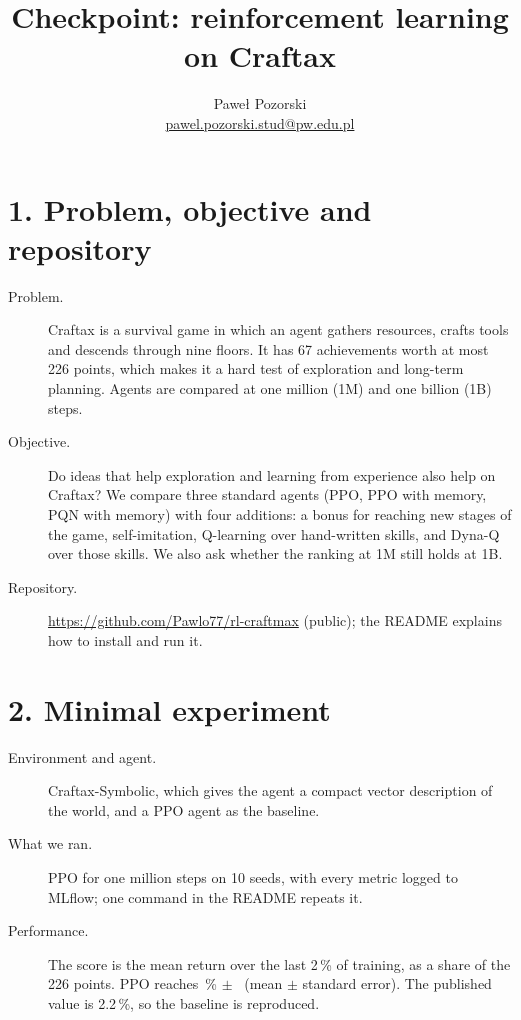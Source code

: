 \documentclass[10pt,a4paper]{article}
\title{Checkpoint: reinforcement learning on Craftax}
\author{Pawe{\l} Pozorski\\{\small\href{mailto:pawel.pozorski.stud@pw.edu.pl}{pawel.pozorski.stud@pw.edu.pl}}}
\date{}
\begin{document}
\small
\maketitle
\vspace{-1.6em}

\section*{1. Problem, objective and repository}

\begin{description}
\item[Problem.] Craftax is a survival game in which an agent gathers resources, crafts tools and descends through nine floors. It has 67 achievements worth at most 226 points, which makes it a hard test of exploration and long-term planning. Agents are compared at one million (1M) and one billion (1B) steps.
\item[Objective.] Do ideas that help exploration and learning from experience also help on Craftax? We compare three standard agents (PPO, PPO with memory, PQN with memory) with four additions: a bonus for reaching new stages of the game, self-imitation, Q-learning over hand-written skills, and Dyna-Q over those skills. We also ask whether the ranking at 1M still holds at 1B.
\item[Repository.] \url{https://github.com/Pawlo77/rl-craftmax} (public); the README explains how to install and run it.
\end{description}

\section*{2. Minimal experiment}

\begin{description}
\item[Environment and agent.] Craftax-Symbolic, which gives the agent a compact vector description of the world, and a PPO agent as the baseline.
\item[What we ran.] PPO for one million steps on 10 seeds, with every metric logged to MLflow; one command in the README repeats it.
\item[Performance.] The score is the mean return over the last 2\,\% of training, as a share of the 226 points. PPO reaches \scoreOneMPpo\,\% $\pm$ \scoreSeOneMPpo\ (mean $\pm$ standard error). The published value is 2.2\,\%, so the baseline is reproduced.
\end{description}
\end{document}
